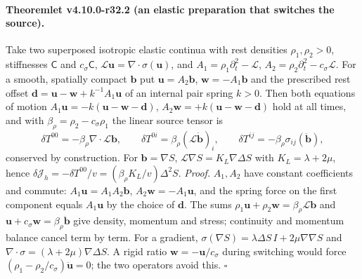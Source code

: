 \paragraph{Theoremlet v4.10.0-r32.2 (an elastic preparation that switches the source).}
Take two superposed isotropic elastic continua with rest densities \(\rho_1,\rho_2>0\), stiffnesses \(\mathsf C\) and \(c_\sigma\mathsf C\),
\(\mathcal L\mathbf u=\nabla\cdot\sigma(\mathbf u)\), and \(A_1=\rho_1\partial_t^2-\mathcal L\), \(A_2=\rho_2\partial_t^2-c_\sigma\mathcal L\).  For a smooth, spatially compact
\(\mathbf b\) put \(\mathbf u=A_2\mathbf b\), \(\mathbf w=-A_1\mathbf b\) and the prescribed rest offset \(\mathbf d=\mathbf u-\mathbf w+k^{-1}A_1\mathbf u\) of an internal
pair spring \(k>0\).  Then both equations of motion \(A_1\mathbf u=-k(\mathbf u-\mathbf w-\mathbf d)\), \(A_2\mathbf w=+k(\mathbf u-\mathbf w-\mathbf d)\) hold at
all times, and with \(\beta_\rho=\rho_2-c_\sigma\rho_1\) the linear source tensor is
\[
 \delta T^{00}=-\beta_\rho\nabla\cdot\mathcal L\mathbf b,\qquad \delta T^{0i}=\beta_\rho(\mathcal L\dot{\mathbf b})_i,\qquad \delta T^{ij}=-\beta_\rho\sigma_{ij}(\ddot{\mathbf b}),
\]
conserved by construction.  For \(\mathbf b=\nabla S\), \(\mathcal L\nabla S=K_L\nabla\Delta S\) with \(K_L=\lambda+2\mu\), hence
\(\delta\mathcal J_h=-\delta T^{00}/v=(\beta_\rho K_L/v)\Delta^2S\).
\emph{Proof.} \(A_1,A_2\) have constant coefficients and commute: \(A_1\mathbf u=A_1A_2\mathbf b\), \(A_2\mathbf w=-A_1\mathbf u\), and the spring force on the first
component equals \(A_1\mathbf u\) by the choice of \(\mathbf d\).  The sums \(\rho_1\mathbf u+\rho_2\mathbf w=\beta_\rho\mathcal L\mathbf b\) and
\(\mathbf u+c_\sigma\mathbf w=\beta_\rho\ddot{\mathbf b}\) give density, momentum and stress; continuity and momentum balance cancel term by term.  For a
gradient, \(\sigma(\nabla S)=\lambda\Delta S\,I+2\mu\nabla\nabla S\) and \(\nabla\cdot\sigma=(\lambda+2\mu)\nabla\Delta S\).  A rigid ratio \(\mathbf w=-\mathbf u/c_\sigma\)
during switching would force \((\rho_1-\rho_2/c_\sigma)\ddot{\mathbf u}=0\); the two operators avoid this.  \(\square\)

